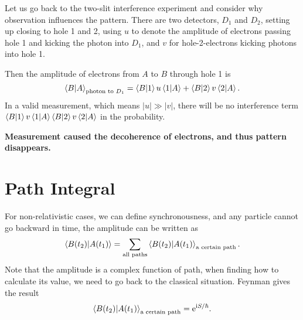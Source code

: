 Let us go back to the two-slit interference experiment and consider why observation influences the pattern. There are two detectors, $D_1$ and $D_2$, setting up closing to hole 1 and 2, using $u$ to denote the amplitude of electrons passing hole 1 and kicking the photon into $D_1$, and $v$ for hole-2-electrons kicking photons into hole 1.

Then the amplitude of electrons from $A$ to $B$ through hole 1 is
\begin{equation}
  \bra{B}\ket{A}_{\text{photon to $D_1$}} = \bra{B}\ket{1}u\bra{1}\ket{A} + \bra{B}\ket{2}v\bra{2}\ket{A}.
\end{equation}
In a valid measurement, which means $|u|\gg |v|$, there will be no interference term $\bra{B}\ket{1}v\bra{1}\ket{A} \bra{B}\ket{2}v\bra{2}\ket{A}$ in the probability.

\textbf{Measurement caused the decoherence of electrons, and thus pattern disappears.}

\section[路径积分]{Path Integral}
For non-relativistic cases, we can define synchronousness, and any particle cannot go backward in time, the amplitude can be written as
\begin{equation}
  \bra{B(t_2)}\ket{A(t_1)} = \sum_{\text{all paths}} \bra{B(t_2)}\ket{A(t_1)}_{\text{a certain path}}.
\end{equation}
Note that the amplitude is a complex function of path, when finding how to calculate its value, we need to go back to the classical situation. Feynman gives the result
\begin{equation}
  \bra{B(t_2)}\ket{A(t_1)}_{\text{a certain path}} = \mathrm{e}^{\mathrm{i} S / \hbar}.
\end{equation}